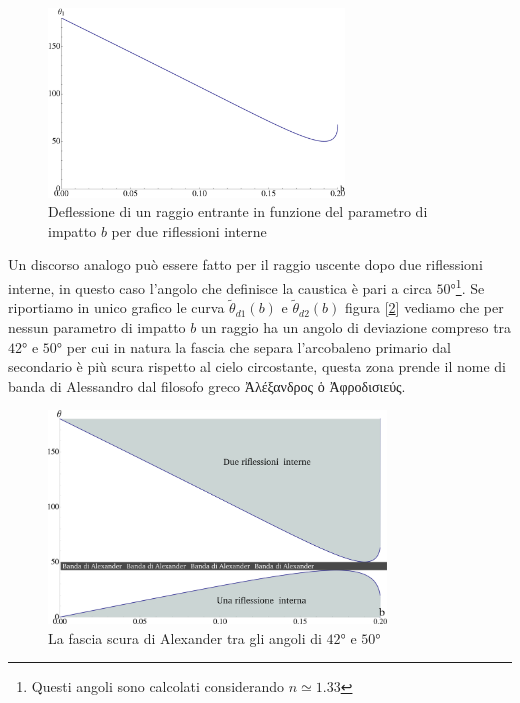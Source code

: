 \documentclass[a4paper,10pt,oneside]{article}
\begin{document}
\begin{figure}[H]
 \centering
 \includegraphics[width=0.7\textwidth]{./Immagini/due_riflessioni.pdf}
 \caption{Deflessione di un raggio entrante in funzione del parametro di impatto $b$ per due riflessioni interne}
 \label{fig:dure_riflessioni}
\end{figure}
 Un discorso analogo può essere fatto per il raggio uscente dopo due riflessioni interne, in questo caso l'angolo che definisce la caustica è pari a circa $50°$\footnote{Questi angoli sono calcolati considerando $n\simeq 1.33$}. Se riportiamo in unico grafico le curva $\tilde\theta_{d1}(b)$ e $\tilde\theta_{d2}(b)$ figura [\ref{fig:alexander_band}] vediamo che per nessun parametro di impatto $b$ un raggio ha un angolo di deviazione compreso tra $42°$ e $50°$ per cui in natura la fascia che separa l'arcobaleno primario dal secondario è più scura rispetto al cielo circostante, questa zona prende il nome di banda di Alessandro dal filosofo greco  \textgreek{Ἀλέξανδρος ὁ Ἀφροδισιεύς}.
\begin{figure}[H]
 \centering
 \includegraphics[width=0.8\textwidth]{./Immagini/alexander_band.png}
 \caption{La fascia scura di Alexander tra gli angoli di $42°$ e $50°$}
 \label{fig:alexander_band}
\end{figure}
\end{document}

